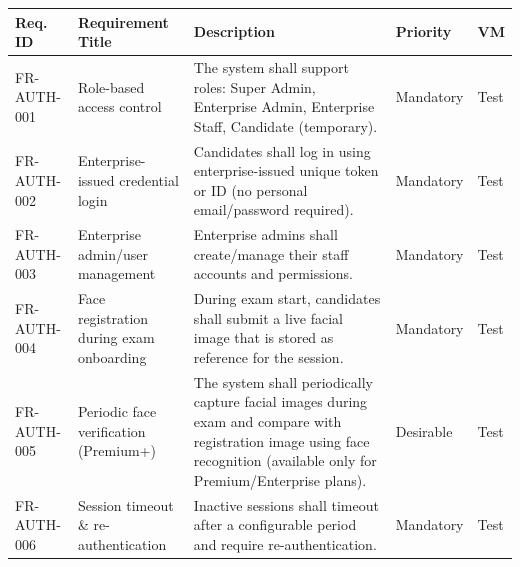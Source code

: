 \begin{tabularx}{\linewidth}{|l|>{\raggedright\arraybackslash}p{4.5cm}|>{\raggedright\arraybackslash}X|l|l|}
\caption{Authentication and User Management Requirements}
\label{tab:auth-requirements} \\ \hline
\textbf{Req. ID} & \textbf{Requirement Title} & \textbf{Description} & \textbf{Priority} & \textbf{VM} \\ \hline
FR-AUTH-001 & Role-based access control & The system shall support roles: Super Admin, Enterprise Admin, Enterprise Staff, Candidate (temporary). & Mandatory & Test \\ \hline
FR-AUTH-002 & Enterprise-issued credential login & Candidates shall log in using enterprise-issued unique token or ID (no personal email/password required). & Mandatory & Test \\ \hline
FR-AUTH-003 & Enterprise admin/user management & Enterprise admins shall create/manage their staff accounts and permissions. & Mandatory & Test \\ \hline
FR-AUTH-004 & Face registration during exam onboarding & During exam start, candidates shall submit a live facial image that is stored as reference for the session. & Mandatory & Test \\ \hline
FR-AUTH-005 & Periodic face verification (Premium+) & The system shall periodically capture facial images during exam and compare with registration image using face recognition (available only for Premium/Enterprise plans). & Desirable & Test \\ \hline
FR-AUTH-006 & Session timeout \& re-authentication & Inactive sessions shall timeout after a configurable period and require re-authentication. & Mandatory & Test \\ \hline
\end{tabularx}

\vspace{3em}

